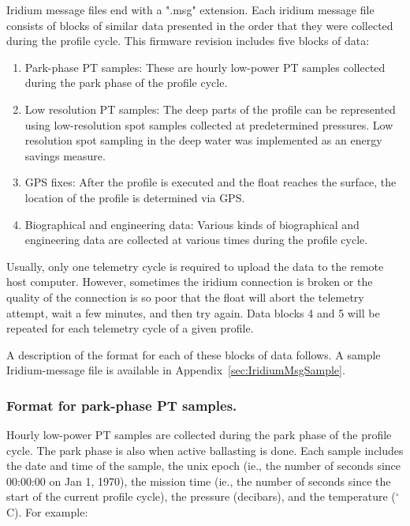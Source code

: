 Iridium message files end with a ".msg" extension.  Each iridium message
file consists of blocks of similar data presented in the order that they
were collected during the profile cycle.  This firmware revision includes
five blocks of data:

\begin{enumerate}
\item Park-phase PT samples: These are hourly low-power PT samples collected
      during the park phase of the profile cycle.

\item Low resolution PT samples: The deep parts of the profile can be
      represented using low-resolution spot samples collected at
      predetermined pressures.  Low resolution spot sampling in the deep
      water was implemented as an energy savings measure.
      
\item GPS fixes: After the profile is executed and the float reaches the
      surface, the location of the profile is determined via GPS.

\item Biographical and engineering data: Various kinds of biographical and
      engineering data are collected at various times during the profile
      cycle.  
\end{enumerate}

Usually, only one telemetry cycle is required to upload the data to the
remote host computer.  However, sometimes the iridium connection is broken
or the quality of the connection is so poor that the float will abort the
telemetry attempt, wait a few minutes, and then try again.  Data blocks 4
and 5 will be repeated for each telemetry cycle of a given profile.

A description of the format for each of these blocks of data follows.  A
sample Iridium-message file is available in Appendix~\ref{sec:IridiumMsgSample}.


\subsubsection{Format for park-phase PT samples.}
\label{sec:PtSample}

   Hourly low-power PT samples are collected during the park phase of the
   profile cycle.  The park phase is also when active ballasting is done.
   Each sample includes the date and time of the sample, the unix epoch (ie.,
   the number of seconds since 00:00:00 on Jan 1, 1970), the mission time
   (ie., the number of seconds since the start of the current profile
   cycle), the pressure (decibars), and the temperature ($^\circ$C).  For example:

